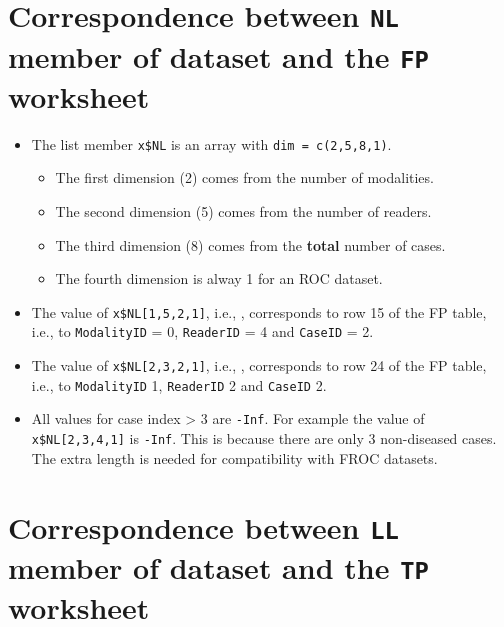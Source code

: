 \documentclass[
]{book}
\providecommand{\tightlist}{%
  \setlength{\itemsep}{0pt}\setlength{\parskip}{0pt}}
\begin{document}
\hypertarget{correspondence-between-nl-member-of-dataset-and-the-fp-worksheet}{%
\section{\texorpdfstring{Correspondence between \texttt{NL} member of dataset and the \texttt{FP} worksheet}{Correspondence between NL member of dataset and the FP worksheet}}\label{correspondence-between-nl-member-of-dataset-and-the-fp-worksheet}}

\begin{itemize}
\tightlist
\item
  The list member \texttt{x\$NL} is an array with \texttt{dim\ =\ c(2,5,8,1)}.

  \begin{itemize}
  \tightlist
  \item
    The first dimension (2) comes from the number of modalities.
  \item
    The second dimension (5) comes from the number of readers.
  \item
    The third dimension (8) comes from the \textbf{total} number of cases.
  \item
    The fourth dimension is alway 1 for an ROC dataset.
  \end{itemize}
\item
  The value of \texttt{x\$NL{[}1,5,2,1{]}}, i.e., , corresponds to row 15 of the FP table, i.e., to \texttt{ModalityID} = 0, \texttt{ReaderID} = 4 and \texttt{CaseID} = 2.
\item
  The value of \texttt{x\$NL{[}2,3,2,1{]}}, i.e., , corresponds to row 24 of the FP table, i.e., to \texttt{ModalityID} 1, \texttt{ReaderID} 2 and \texttt{CaseID} 2.
\item
  All values for case index \textgreater{} 3 are \texttt{-Inf}. For example the value of \texttt{x\$NL{[}2,3,4,1{]}} is \texttt{-Inf}. This is because there are only 3 non-diseased cases. The extra length is needed for compatibility with FROC datasets.
\end{itemize}

\hypertarget{correspondence-between-ll-member-of-dataset-and-the-tp-worksheet}{%
\section{\texorpdfstring{Correspondence between \texttt{LL} member of dataset and the \texttt{TP} worksheet}{Correspondence between LL member of dataset and the TP worksheet}}\label{correspondence-between-ll-member-of-dataset-and-the-tp-worksheet}}
\end{document}
